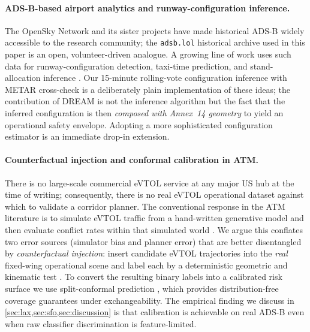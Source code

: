 \paragraph{ADS-B-based airport analytics and runway-configuration inference.}
The OpenSky Network \citep{schafer2014opensky} and its sister projects have
made historical ADS-B widely accessible to the research community; the
\texttt{adsb.lol} historical archive used in this paper is an open,
volunteer-driven analogue. A growing line of work uses such data for
runway-configuration detection, taxi-time prediction, and stand-allocation
inference \citep{olive2019traffic,riboulet2020runway}. Our 15-minute
rolling-vote configuration inference with METAR cross-check is a deliberately
plain implementation of these ideas; the contribution of DREAM is not the
inference algorithm but the fact that the inferred configuration is then
\emph{composed with Annex~14 geometry} to yield an operational safety
envelope. Adopting a more sophisticated configuration estimator
\citep{riboulet2020runway} is an immediate drop-in extension.

\paragraph{Counterfactual injection and conformal calibration in ATM.}
There is no large-scale commercial eVTOL service at any major US hub at the
time of writing; consequently, there is no real eVTOL operational dataset
against which to validate a corridor planner. The conventional response in
the ATM literature is to simulate eVTOL traffic from a hand-written generative
model and then evaluate conflict rates within that simulated world
\citep{bulusu2021,kleinbekman2020}. We argue this conflates two error sources
(simulator bias and planner error) that are better disentangled by
\emph{counterfactual injection}: insert candidate eVTOL trajectories into the
\emph{real} fixed-wing operational scene and label each by a deterministic
geometric and kinematic test \citep{rtca_dolca,lefebvre2018}. To convert the
resulting binary labels into a calibrated risk surface we use split-conformal
prediction \citep{vovk_conformal,angelopoulos2021gentle}, which provides
distribution-free coverage guarantees under exchangeability. The empirical
finding we discuss in \cref{sec:lax,sec:sfo,sec:discussion} is that
calibration is achievable on real ADS-B even when raw classifier
discrimination is feature-limited.
